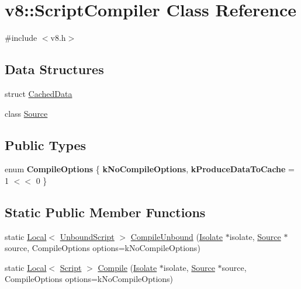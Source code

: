 \hypertarget{classv8_1_1ScriptCompiler}{\section{v8\-:\-:Script\-Compiler Class Reference}
\label{classv8_1_1ScriptCompiler}
}


{\ttfamily \#include $<$v8.\-h$>$}

\subsection*{Data Structures}
\begin{DoxyCompactItemize}
\item 
struct \hyperlink{structv8_1_1ScriptCompiler_1_1CachedData}{Cached\-Data}
\item 
class \hyperlink{classv8_1_1ScriptCompiler_1_1Source}{Source}
\end{DoxyCompactItemize}
\subsection*{Public Types}
\begin{DoxyCompactItemize}
\item 
enum {\bfseries Compile\-Options} \{ {\bfseries k\-No\-Compile\-Options}, 
{\bfseries k\-Produce\-Data\-To\-Cache} =  1 $<$$<$ 0
 \}
\end{DoxyCompactItemize}
\subsection*{Static Public Member Functions}
\begin{DoxyCompactItemize}
\item 
static \hyperlink{classv8_1_1Local}{Local}$<$ \hyperlink{classv8_1_1UnboundScript}{Unbound\-Script} $>$ \hyperlink{classv8_1_1ScriptCompiler_a5f590f94e2705d12392c17b7fa097e1d}{Compile\-Unbound} (\hyperlink{classv8_1_1Isolate}{Isolate} $\ast$isolate, \hyperlink{classv8_1_1ScriptCompiler_1_1Source}{Source} $\ast$source, Compile\-Options options=k\-No\-Compile\-Options)
\item 
static \hyperlink{classv8_1_1Local}{Local}$<$ \hyperlink{classv8_1_1Script}{Script} $>$ \hyperlink{classv8_1_1ScriptCompiler_a4cef8b34c2744f6508a9ce53182c19bf}{Compile} (\hyperlink{classv8_1_1Isolate}{Isolate} $\ast$isolate, \hyperlink{classv8_1_1ScriptCompiler_1_1Source}{Source} $\ast$source, Compile\-Options options=k\-No\-Compile\-Options)
\end{DoxyCompactItemize}


